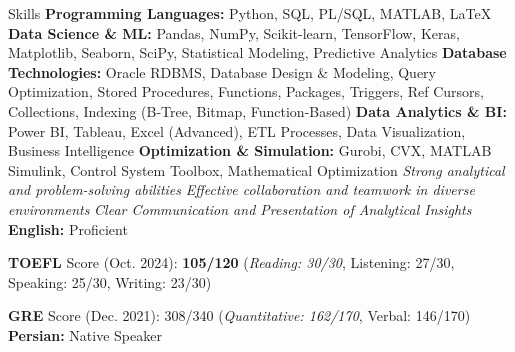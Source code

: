 \begin{rubric}{Skills}
\entry*%
    \textbf{Programming Languages:} Python, SQL, PL/SQL, MATLAB, \LaTeX
\entry*%
    \textbf{Data Science \& ML:} Pandas, NumPy, Scikit-learn, TensorFlow, Keras, Matplotlib, Seaborn, SciPy, Statistical Modeling, Predictive Analytics
\entry*%
    \textbf{Database Technologies:} Oracle RDBMS, Database Design \& Modeling, Query Optimization, Stored Procedures, Functions, Packages, Triggers, Ref Cursors, Collections, Indexing (B-Tree, Bitmap, Function-Based)
\entry*%
    \textbf{Data Analytics \& BI:} Power BI, Tableau, Excel (Advanced), ETL Processes, Data Visualization, Business Intelligence
\entry*%
    \textbf{Optimization \& Simulation:} Gurobi, CVX, MATLAB Simulink, Control System Toolbox, Mathematical Optimization
\entry*%
    \textit{Strong analytical and problem-solving abilities}
\entry*%
    \textit{Effective collaboration and teamwork in diverse environments}
\entry*%
    \textit{Clear Communication and Presentation of Analytical Insights}
\entry*%
    \textbf{English:} Proficient  
    \par \textbf{TOEFL} Score (Oct. 2024): \textbf{105/120} (\textit{Reading: 30/30}, Listening: 27/30, Speaking: 25/30, Writing: 23/30)  
    \par \textbf{GRE} Score (Dec. 2021): 308/340 (\textit{Quantitative: 162/170}, Verbal: 146/170)
\entry*%
    \textbf{Persian:} Native Speaker
\end{rubric}


